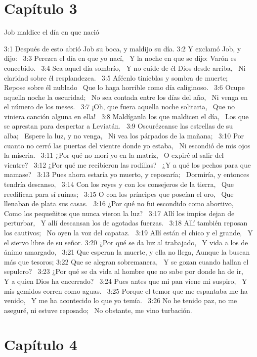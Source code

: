 \section*{Capítulo 3}
Job maldice el día en que nació  

3:1 Después de esto abrió Job su boca, y maldijo su día. 
3:2 Y exclamó Job, y dijo:  
3:3 Perezca el día en que yo nací,  
Y la noche en que se dijo: Varón es concebido.  
3:4 Sea aquel día sombrío,  
Y no cuide de él Dios desde arriba,  
Ni claridad sobre él resplandezca.  
3:5 Aféenlo tinieblas y sombra de muerte;  
Repose sobre él nublado  
Que lo haga horrible como día caliginoso.  
3:6 Ocupe aquella noche la oscuridad;  
No sea contada entre los días del año,  
Ni venga en el número de los meses.  
3:7 ¡Oh, que fuera aquella noche solitaria,  
Que no viniera canción alguna en ella!  
3:8 Maldíganla los que maldicen el día,  
Los que se aprestan para despertar a Leviatán.  
3:9 Oscurézcanse las estrellas de su alba;  
Espere la luz, y no venga,  
Ni vea los párpados de la mañana;  
3:10 Por cuanto no cerró las puertas del vientre donde yo estaba,  
Ni escondió de mis ojos la miseria.  
3:11 ¿Por qué no morí yo en la matriz,  
O expiré al salir del vientre?  
3:12 ¿Por qué me recibieron las rodillas?  
¿Y a qué los pechos para que mamase?  
3:13 Pues ahora estaría yo muerto, y reposaría;  
Dormiría, y entonces tendría descanso,  
3:14 Con los reyes y con los consejeros de la tierra,  
Que reedifican para sí ruinas;  
3:15 O con los príncipes que poseían el oro,  
Que llenaban de plata sus casas.  
3:16 ¿Por qué no fui escondido como abortivo,  
Como los pequeñitos que nunca vieron la luz?  
3:17 Allí los impíos dejan de perturbar,  
Y allí descansan los de agotadas fuerzas.  
3:18 Allí también reposan los cautivos;  
No oyen la voz del capataz.  
3:19 Allí están el chico y el grande,  
Y el siervo libre de su señor. 
3:20 ¿Por qué se da luz al trabajado,  
Y vida a los de ánimo amargado,  
3:21 Que esperan la muerte, y ella no llega, 
Aunque la buscan más que tesoros; 
3:22 Que se alegran sobremanera,  
Y se gozan cuando hallan el sepulcro?  
3:23 ¿Por qué se da vida al hombre que no sabe por donde ha de ir,  
Y a quien Dios ha encerrado?  
3:24 Pues antes que mi pan viene mi suspiro,  
Y mis gemidos corren como aguas.  
3:25 Porque el temor que me espantaba me ha venido,  
Y me ha acontecido lo que yo temía.  
3:26 No he tenido paz, no me aseguré, ni estuve reposado;  
No obstante, me vino turbación.  
\section*{Capítulo 4}


